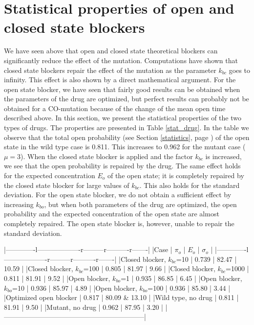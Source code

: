 {\bigskip


\section{Statistical properties of open and closed state blockers}
\label{stat1Ddrg}

We have seen above that open and closed state theoretical blockers can significantly reduce the effect of the mutation. Computations have shown that closed state blockers repair the effect of the mutation as the parameter $k_{bc}$ goes to infinity. This effect is also shown by a direct mathematical argument. For the open state blocker, we have seen that fairly good results can be obtained when the parameters of the drug are optimized, but perfect results can probably not be obtained for a CO-mutation because of the change of the mean open time described above.
In this section, we present the statistical properties of the two types of drugs. The properties are presented in Table \ref{stat_drug}. In the table we observe that the total open probability (see Section \ref{statistics}, page  \pageref{statistics}) of the open state in the wild type case is 0.811. This increases to 0.962 for the mutant case ($\mu=3$). When the closed state blocker is applied and the factor $k_{bc}$ is increased, we see that the open probability is repaired by the drug. The same effect holds for the expected concentration $E_o$ of the open state; it is completely repaired by the closed state blocker for large values of $k_{bc}$. This also holds for the standard deviation. For the open state blocker, we do not obtain a sufficient effect by increasing $k_{bo}$, but when both parameters of the drug are optimized, the open probability and the expected concentration of the open state are almost completely repaired. The open state blocker is, however, unable to repair the standard deviation. 



|-------------l-------------------r---------r----------r-------|
|Case                          | $\pi_o$ | $E_o$ | $\sigma_o$  |
|-------------l-------------------r---------r----------r-------|
|Closed blocker, $k_{bc}$=10   | 0.739   | 82.47 | 10.59       |
|Closed blocker, $k_{bc}$=100  | 0.805   | 81.97 | 9.66        |
|Closed blocker, $k_{bc}$=1000 | 0.811   | 81.91 | 9.52        |
|Open blocker, $k_{bo}$=1      | 0.935   | 86.85 | 6.45        |
|Open blocker, $k_{bo}$=10     | 0.936   | 85.97 | 4.89        |
|Open blocker, $k_{bo}$=100    | 0.936   | 85.80 | 3.44        |
|Optimized open blocker        | 0.817   | 80.09 & 13.10       |
|Wild type, no drug            | 0.811   | 81.91 | 9.50        |
|Mutant, no drug               | 0.962   | 87.95 | 3.20        |
|--------------------------------------------------------------|


}
